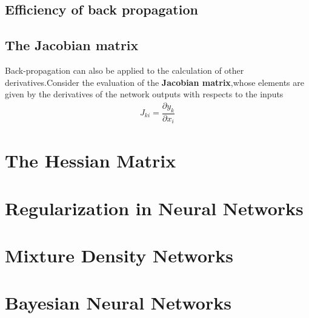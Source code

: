 \subsection{Efficiency of back propagation}

\subsection{The Jacobian matrix}
Back-propagation can also be applied to the calculation of other derivatives.Consider the evaluation of the \textbf{Jacobian matrix},whose elements are given by the derivatives of the network outputs with respects to the inputs
\begin{align}
    J_{ki}=\dfrac{\partial y_k}{\partial x_i}
\end{align}


\section{The Hessian Matrix}

\section{Regularization in Neural Networks}










\section{Mixture Density Networks}

\section{Bayesian Neural Networks}
